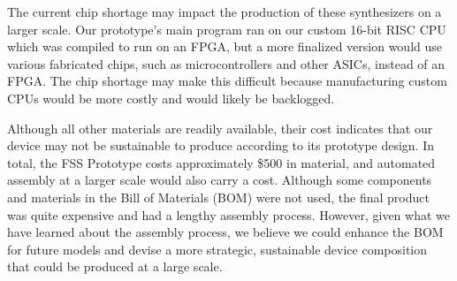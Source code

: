 \documentclass[conference]{IEEEtran}
\begin{document}
The current chip shortage may impact the production of these synthesizers on a larger scale. Our prototype's main program ran on our custom 16-bit RISC CPU which was compiled to run on an FPGA, but a more finalized version would use various fabricated chips, such as microcontrollers and other ASICs, instead of an FPGA. The chip shortage may make this difficult because manufacturing custom CPUs would be more costly and would likely be backlogged.

Although all other materials are readily available, their cost indicates that our device may not be sustainable to produce according to its prototype design. In total, the FSS Prototype costs approximately \$500 in material, and automated assembly at a larger scale would also carry a cost. Although some components and materials in the Bill of Materials (BOM) were not used, the final product was quite expensive and had a lengthy assembly process. However, given what we have learned about the assembly process, we believe we could enhance the BOM for future models and devise a more strategic, sustainable device composition that could be produced at a large scale.
\end{document}
